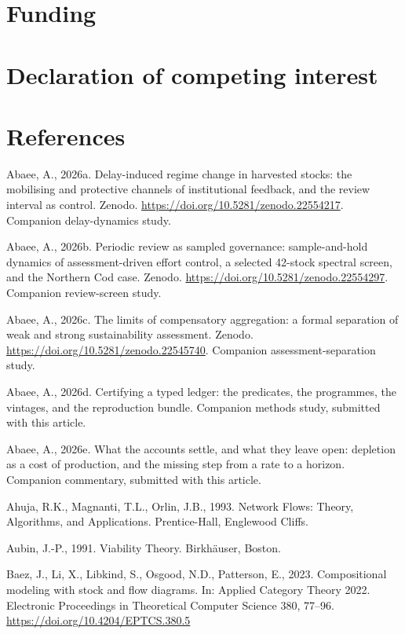 \documentclass[11pt]{article}
\begin{document}
\section*{Funding}\label{funding}

\section*{Declaration of competing interest}\label{declaration-of-competing-interest}

\vspace{0.8em}

\section*{References}\label{references}

Abaee, A., 2026a. Delay-induced regime change in harvested stocks: the mobilising and protective channels of institutional feedback, and the review interval as control. Zenodo. \url{https://doi.org/10.5281/zenodo.22554217}. Companion delay-dynamics study.

Abaee, A., 2026b. Periodic review as sampled governance: sample-and-hold dynamics of assessment-driven effort control, a selected 42-stock spectral screen, and the Northern Cod case. Zenodo. \url{https://doi.org/10.5281/zenodo.22554297}. Companion review-screen study.

Abaee, A., 2026c. The limits of compensatory aggregation: a formal separation of weak and strong sustainability assessment. Zenodo. \url{https://doi.org/10.5281/zenodo.22545740}. Companion assessment-separation study.

Abaee, A., 2026d. Certifying a typed ledger: the predicates, the programmes, the vintages, and the reproduction bundle. Companion methods study, submitted with this article.

Abaee, A., 2026e. What the accounts settle, and what they leave open: depletion as a cost of production, and the missing step from a rate to a horizon. Companion commentary, submitted with this article.

Ahuja, R.K., Magnanti, T.L., Orlin, J.B., 1993. Network Flows: Theory, Algorithms, and Applications. Prentice-Hall, Englewood Cliffs.

Aubin, J.-P., 1991. Viability Theory. Birkh\"{a}user, Boston.

Baez, J., Li, X., Libkind, S., Osgood, N.D., Patterson, E., 2023. Compositional modeling with stock and flow diagrams. In: Applied Category Theory 2022. Electronic Proceedings in Theoretical Computer Science 380, 77--96. \url{https://doi.org/10.4204/EPTCS.380.5}
\end{document}
